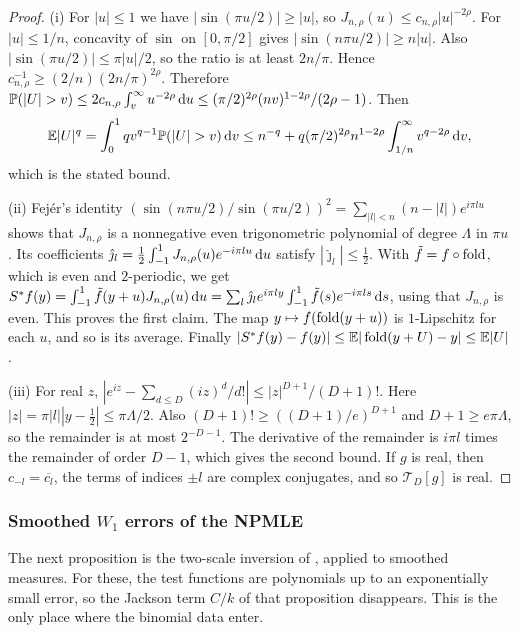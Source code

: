 \documentclass[11pt]{amsart}
\theoremstyle{definition}
\theoremstyle{remark}
\begin{document}
\begin{proof}
(i) For $|u|\le1$ we have $|\sin(\pi u/2)|\ge|u|$, so
$J_{n,\rho}(u)\le c_{n,\rho}|u|^{-2\rho}$.  For $|u|\le1/n$, concavity of
$\sin$ on $[0,\pi/2]$ gives $|\sin(n\pi u/2)|\ge n|u|$.  Also
$|\sin(\pi u/2)|\le\pi|u|/2$, so the ratio is at least $2n/\pi$.  Hence
$c_{n,\rho}^{-1}\ge(2/n)(2n/\pi)^{2\rho}$.  Therefore
$\RfP(|U|>v)\le2c_{n,\rho}\int_v^\infty u^{-2\rho}\Rfd u\le(\pi/2)^{2\rho}(nv)^{1-2\rho}/(2\rho-1)$.
Then
\[
 \RfE|U|^q=\int_0^1qv^{q-1}\RfP(|U|>v)\Rfd v
 \le n^{-q}+q(\pi/2)^{2\rho}n^{1-2\rho}\int_{1/n}^\infty v^{q-2\rho}\Rfd v ,
\]
which is the stated bound.

(ii) Fej\'er's identity
$(\sin(n\pi u/2)/\sin(\pi u/2))^2=\sum_{|l|<n}(n-|l|)e^{i\pi lu}$ shows that
$J_{n,\rho}$ is a nonnegative even trigonometric polynomial of degree
$\Lambda$ in $\pi u$.  Its coefficients
$\hat\jmath_l=\frac12\int_{-1}^1J_{n,\rho}(u)e^{-i\pi lu}\,\mathrm{d} u$ satisfy
$|\hat\jmath_l|\le\frac12$.  With $\tilde f=f\circ\operatorname{fold}$, which is even
and $2$-periodic, we get
$S^*f(y)=\int_{-1}^1\tilde f(y+u)J_{n,\rho}(u)\,\mathrm{d} u
=\sum_l\hat\jmath_le^{i\pi ly}\int_{-1}^1\tilde f(s)e^{-i\pi ls}\,\mathrm{d} s$,
using that $J_{n,\rho}$ is even.  This proves the first claim.  The map
$y\mapsto f(\operatorname{fold}(y+u))$ is $1$-Lipschitz for each $u$, and so is its
average.  Finally $|S^*f(y)-f(y)|\le\mathbb{E}|\operatorname{fold}(y+U)-y|\le\mathbb{E}|U|$.

(iii) For real $z$, $|e^{iz}-\sum_{d\le D}(iz)^d/d!|\le|z|^{D+1}/(D+1)!$.
Here $|z|=\pi|l||y-\frac12|\le\pi\Lambda/2$.  Also
$(D+1)!\ge((D+1)/e)^{D+1}$ and $D+1\ge e\pi\Lambda$, so the remainder is at
most $2^{-D-1}$.  The derivative of the remainder is $i\pi l$ times the
remainder of order $D-1$, which gives the second bound.  If $g$ is real,
then $c_{-l}=\overline{c_l}$, the terms of indices $\pm l$ are complex
conjugates, and so $\mathcal T_D[g]$ is real.
\end{proof}

\subsubsection{Smoothed \texorpdfstring{$W_1$}{W1} errors of the NPMLE}

The next proposition is the two-scale inversion of
\cite[Part~VI, Proposition p06:bm:twoscale]{K-029}, applied to smoothed
measures.  For these, the test functions are polynomials up to an
exponentially small error, so the Jackson term $C/k$ of that proposition
disappears.  This is the only place where the binomial data enter.
\end{document}
